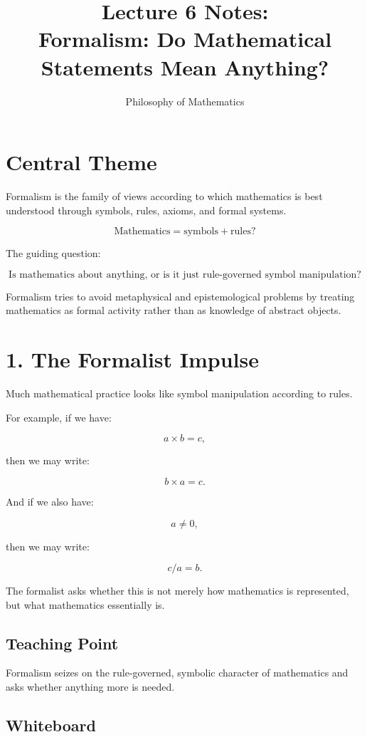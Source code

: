 \documentclass[11pt]{article}
\title{Lecture 6 Notes: \\ Formalism: Do Mathematical Statements Mean Anything?}
\author{Philosophy of Mathematics}
\date{}
\begin{document}
\maketitle

\section*{Central Theme}

Formalism is the family of views according to which mathematics is best understood
through symbols, rules, axioms, and formal systems.

\[
\boxed{
\text{Mathematics} = \text{symbols} + \text{rules?}
}
\]

The guiding question:

\[
\boxed{
\text{Is mathematics about anything, or is it just rule-governed symbol manipulation?}
}
\]

Formalism tries to avoid metaphysical and epistemological problems by treating
mathematics as formal activity rather than as knowledge of abstract objects.

\section*{1. The Formalist Impulse}

Much mathematical practice looks like symbol manipulation according to rules.

For example, if we have:

\[
a \times b = c,
\]

then we may write:

\[
b \times a = c.
\]

And if we also have:

\[
a \neq 0,
\]

then we may write:

\[
c/a = b.
\]

The formalist asks whether this is not merely how mathematics is represented, but what
mathematics essentially is.

\subsection*{Teaching Point}

Formalism seizes on the rule-governed, symbolic character of mathematics and asks
whether anything more is needed.

\subsection*{Whiteboard}
\end{document}
